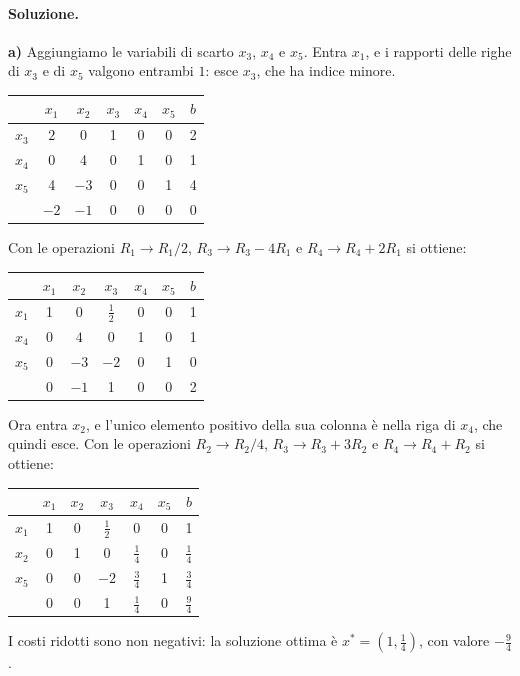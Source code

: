 \paragraph{Soluzione.}
\textbf{a)} Aggiungiamo le variabili di scarto $x_3$, $x_4$ e $x_5$. Entra $x_1$, e i rapporti delle righe di $x_3$ e di $x_5$ valgono entrambi $1$: esce $x_3$, che ha indice minore.
\begin{center}
\begin{tabular}{c|ccccc|c}
 & $x_1$ & $x_2$ & $x_3$ & $x_4$ & $x_5$ & $b$ \\
\hline
$x_3$ & $\boxed{2}$ & 0 & 1 & 0 & 0 & 2 \\
$x_4$ & 0 & 4 & 0 & 1 & 0 & 1 \\
$x_5$ & 4 & $-3$ & 0 & 0 & 1 & 4 \\
\hline
 & $-2$ & $-1$ & 0 & 0 & 0 & 0 \\
\end{tabular}
\end{center}
Con le operazioni $R_1 \to R_1/2$, $R_3 \to R_3 - 4R_1$ e $R_4 \to R_4 + 2R_1$ si ottiene:
\begin{center}
\begin{tabular}{c|ccccc|c}
 & $x_1$ & $x_2$ & $x_3$ & $x_4$ & $x_5$ & $b$ \\
\hline
$x_1$ & 1 & 0 & $\frac12$ & 0 & 0 & 1 \\
$x_4$ & 0 & $\boxed{4}$ & 0 & 1 & 0 & 1 \\
$x_5$ & 0 & $-3$ & $-2$ & 0 & 1 & 0 \\
\hline
 & 0 & $-1$ & 1 & 0 & 0 & 2 \\
\end{tabular}
\end{center}
Ora entra $x_2$, e l'unico elemento positivo della sua colonna è nella riga di $x_4$, che quindi esce. Con le operazioni $R_2 \to R_2/4$, $R_3 \to R_3 + 3R_2$ e $R_4 \to R_4 + R_2$ si ottiene:
\begin{center}
\begin{tabular}{c|ccccc|c}
 & $x_1$ & $x_2$ & $x_3$ & $x_4$ & $x_5$ & $b$ \\
\hline
$x_1$ & 1 & 0 & $\frac12$ & 0 & 0 & 1 \\
$x_2$ & 0 & 1 & 0 & $\frac14$ & 0 & $\frac14$ \\
$x_5$ & 0 & 0 & $-2$ & $\frac34$ & 1 & $\frac34$ \\
\hline
 & 0 & 0 & 1 & $\frac14$ & 0 & $\frac94$ \\
\end{tabular}
\end{center}
I costi ridotti sono non negativi: la soluzione ottima è $x^* = (1, \frac14)$, con valore $-\frac94$.

